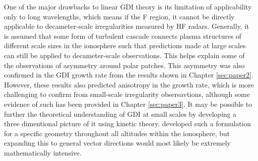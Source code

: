 One of the major drawbacks to linear GDI theory is its limitation of applicability only to long wavelengths, which means if the F region, it cannot be directly applicable to decameter-scale irregularities measured by HF radars.  Generally, it is assumed that some form of turbulent cascade connects plasma structures of different scale sizes in the ionosphere such that predictions made at large scales can still be applied to decameter-scale observations.  This helps explain some of the observations of asymmetry around polar patches.  This asymmetry was also confirmed in the GDI growth rate from the results shown in Chapter \ref{sec:paper2}.  However, these results also predicted anisotropy in the growth rate, which is more challenging to confirm from small-scale irregularity obsersavtions, although some evidence of such has been provided in Chapter \ref{sec:paper3}.  It may be possible to further the theoretical understanding of GDI at small scales by developing a three dimentional picture of it using kinetic theory.  \citet{Basu1995} developed such a formulation for a specific geometry throughout all altitudes within the ionosphere, but expanding this to general vector directions would most likely be extremely mathematically intensive.

